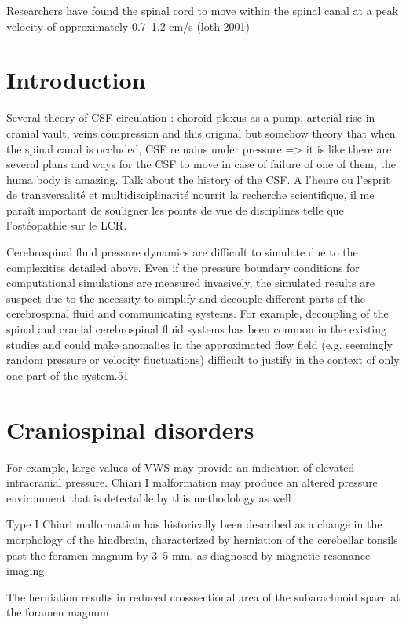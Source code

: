 \documentclass{report}
\begin{document}
Researchers have found the spinal cord to move within the
spinal canal at a peak velocity of approximately 0.7–1.2 cm/s (loth 2001)

\section{Introduction}

Several theory of CSF circulation : choroid plexus as a pump, arterial rise in cranial vault, veins compression and this original but somehow theory that when the spinal canal is occluded, CSF remains under pressure => it is like there are several plans and ways for the CSF to move in case of failure of one of them, the huma body is amazing. Talk about the history of the CSF. A l'heure ou l'esprit de transversalité et multidisciplinarité nourrit la recherche scientifique, il me paraît important de souligner les points de vue de disciplines telle que l'ostéopathie sur le LCR.

Cerebrospinal fluid pressure dynamics are difficult
to simulate due to the complexities detailed above.
Even if the pressure boundary conditions for computational
simulations are measured invasively, the
simulated results are suspect due to the necessity to
simplify and decouple different parts of the cerebrospinal
fluid and communicating systems. For
example, decoupling of the spinal and cranial
cerebrospinal fluid systems has been common in the
existing studies and could make anomalies in the
approximated flow field (e.g. seemingly random pressure
or velocity fluctuations) difficult to justify in the
context of only one part of the system.51

\section{Craniospinal disorders}

\cite{oldefield}

For example,
large values of VWS may provide an indication of elevated intracranial
pressure. Chiari I malformation may produce an altered pressure
environment that is detectable by this methodology as well

Type I Chiari malformation has historically been
described as a change in the morphology of the
hindbrain, characterized by herniation of the cerebellar
tonsils past the foramen magnum by 3–5 mm,
as diagnosed by magnetic resonance imaging

The herniation results in reduced crosssectional
area of the subarachnoid space at the
foramen magnum
\end{document}
